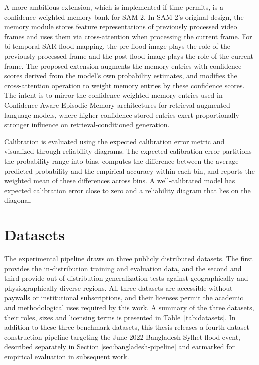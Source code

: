 \documentclass[11pt,a4paper,oneside]{report}
\begin{document}
A more ambitious extension, which is implemented if time permits, is a confidence-weighted memory bank for SAM 2. In SAM 2's original design, the memory module stores feature representations of previously processed video frames and uses them via cross-attention when processing the current frame. For bi-temporal SAR flood mapping, the pre-flood image plays the role of the previously processed frame and the post-flood image plays the role of the current frame. The proposed extension augments the memory entries with confidence scores derived from the model's own probability estimates, and modifies the cross-attention operation to weight memory entries by these confidence scores. The intent is to mirror the confidence-weighted memory entries used in Confidence-Aware Episodic Memory architectures for retrieval-augmented language models, where higher-confidence stored entries exert proportionally stronger influence on retrieval-conditioned generation.

Calibration is evaluated using the expected calibration error metric and visualized through reliability diagrams. The expected calibration error partitions the probability range into bins, computes the difference between the average predicted probability and the empirical accuracy within each bin, and reports the weighted mean of these differences across bins. A well-calibrated model has expected calibration error close to zero and a reliability diagram that lies on the diagonal.

\section{Datasets}

The experimental pipeline draws on three publicly distributed datasets. The first provides the in-distribution training and evaluation data, and the second and third provide out-of-distribution generalization tests against geographically and physiographically diverse regions. All three datasets are accessible without paywalls or institutional subscriptions, and their licenses permit the academic and methodological uses required by this work. A summary of the three datasets, their roles, sizes and licensing terms is presented in Table~\ref{tab:datasets}. In addition to these three benchmark datasets, this thesis releases a fourth dataset construction pipeline targeting the June 2022 Bangladesh Sylhet flood event, described separately in Section \ref{sec:bangladesh-pipeline} and earmarked for empirical evaluation in subsequent work.
\end{document}
